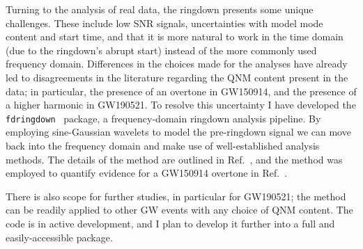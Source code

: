\documentclass[
12pt, %
english, %
doublespacing, %
headsepline, %
]{MastersDoctoralThesis} %
\begin{document}
Turning to the analysis of real data, the ringdown presents some unique challenges. 
These include low SNR signals, uncertainties with model mode content and start time, and that it is more natural to work in the time domain (due to the ringdown's abrupt start) instead of the more commonly used frequency domain.
Differences in the choices made for the analyses have already led to disagreements in the literature regarding the QNM content present in the data; in particular, the presence of an overtone in GW150914, and the presence of a higher harmonic in GW190521. 
To resolve this uncertainty I have developed the \texttt{fdringdown}~\cite{fdringdown} package, a frequency-domain ringdown analysis pipeline.
By employing sine-Gaussian wavelets to model the pre-ringdown signal we can move back into the frequency domain and make use of well-established analysis methods. 
The details of the method are outlined in Ref.~\cite{Finch:2021qph}, and the method was employed to quantify evidence for a GW150914 overtone in Ref.~\cite{Finch:2022ynt}.

There is also scope for further studies, in particular for GW190521; the method can be readily applied to other GW events with any choice of QNM content. 
The code is in active development, and I plan to develop it further into a full and easily-accessible package.





%
%
%


\singlespacing
\printbibliography

\end{document}
